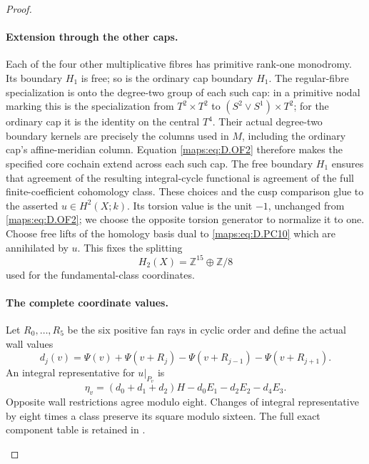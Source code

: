 \begin{proof}
\begin{enumerate}[label=\arabic*.,leftmargin=*]
\paragraph{Extension through the other caps.}
Each of the four other multiplicative fibres has primitive
rank-one monodromy. Its boundary \(H_1\) is free; so is the
ordinary cap boundary \(H_1\).
The regular-fibre specialization is onto the degree-two group
of each such cap: in a primitive nodal marking this is the
specialization from \(T^2\times T^2\) to
\((S^2\vee S^1)\times T^2\); for the ordinary cap it is the
identity on the central \(T^4\).
Their actual degree-two boundary kernels
are precisely the columns used in \(M\), including the
ordinary cap's affine-meridian column.
Equation \eqref{maps:eq:D.OF2} therefore makes the specified core cochain
extend across each such cap. The free boundary \(H_1\)
ensures that agreement of the resulting integral-cycle
functional is agreement of the full finite-coefficient
cohomology class. These choices and the cusp comparison
glue to the asserted \(u\in H^2(X;k)\).
Its torsion value is the unit \(-1\), unchanged from \eqref{maps:eq:D.OF2};
we choose the opposite torsion generator to normalize it to one.
Choose free lifts of the homology basis dual to \eqref{maps:eq:D.PC10}
which are annihilated by \(u\). This fixes the splitting
\[
                         H_2(X)=\mathbb Z^{15}\oplus\mathbb Z/8
                                                               \tag{D.OF15}\label{maps:eq:D.OF15}
\]
used for the fundamental-class coordinates.

\paragraph{The complete coordinate values.}
Let \(R_0,\ldots,R_5\) be the six positive fan rays in cyclic
order and define the actual wall values
\[
 d_j(v)=\Psi(v)+\Psi(v+R_j)
                    -\Psi(v+R_{j-1})-\Psi(v+R_{j+1}).
\]
An integral representative for \(u|_{P_v}\) is
\[
 \eta_v=(d_0+d_1+d_2)H-d_0E_1-d_2E_2-d_4E_3.             \tag{D.OF16}\label{maps:eq:D.OF16}
\]
Opposite wall restrictions agree modulo eight. Changes of integral
representative by eight times a class preserve its square modulo
sixteen. The full exact component table is retained in
.


\end{enumerate}
\end{proof}
